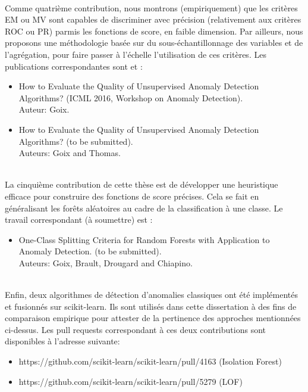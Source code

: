 \documentclass[a4paper, 12pt]{article}
\begin{document}
~\\
Comme quatrième contribution, nous montrons (empiriquement) que les critères EM ou MV sont capables de discriminer avec précision (relativement aux critères ROC ou PR) parmis les fonctions de score, en faible dimension. Par ailleurs, nous proposons une méthodologie basée sur du sous-échantillonnage des variables et de l'agrégation,  pour faire passer à l'échelle l'utilisation de ces critères.
Les publications correspondantes sont \cite{ICMLworkshop16} et \cite{NIPS16evaluation}:
\begin{itemize}
\item How to Evaluate the Quality of Unsupervised Anomaly Detection Algorithms? (ICML 2016, Workshop on Anomaly Detection). %
  \\
Auteur: Goix. 
\item How to Evaluate the Quality of Unsupervised Anomaly Detection Algorithms? (to be submitted).\\ Auteurs: Goix and Thomas. 
\end{itemize}

~\\
La cinquième contribution de cette thèse est de développer une heuristique efficace pour construire des fonctions de score précises. Cela se fait en généralisant les forêts aléatoires au cadre de la classification à une classe. Le travail correspondant (à soumettre) est \cite{OCRF16}:
%
\begin{itemize}
\item One-Class Splitting Criteria for Random Forests with Application to Anomaly Detection. (to be submitted).\\
Auteurs: Goix, Brault, Drougard and Chiapino.
\end{itemize}

~\\
Enfin, deux algorithmes de détection d'anomalies classiques ont été implémentés et fusionnés sur scikit-learn. Ils sont utilisés dans cette dissertation à des fins de comparaison empirique pour attester de la pertinence des approches mentionnées ci-dessus.
Les pull requests correspondant à ces deux contributions sont disponibles à l'adresse suivante:
%
\begin{itemize}
\item https://github.com/scikit-learn/scikit-learn/pull/4163  (Isolation Forest)
\item https://github.com/scikit-learn/scikit-learn/pull/5279 (LOF)
\end{itemize}
\end{document}
